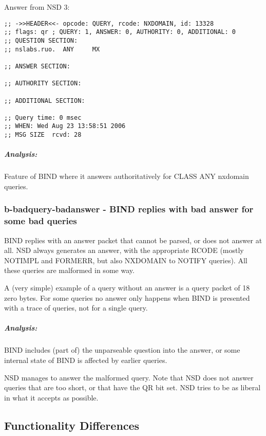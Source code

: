 \documentclass[twoside,titlepage,english]{nlnetlabs}
\begin{document}
Answer from NSD 3:

\footnotesize
\begin{verbatim}
;; ->>HEADER<<- opcode: QUERY, rcode: NXDOMAIN, id: 13328
;; flags: qr ; QUERY: 1, ANSWER: 0, AUTHORITY: 0, ADDITIONAL: 0
;; QUESTION SECTION:
;; nslabs.ruo.  ANY     MX

;; ANSWER SECTION:

;; AUTHORITY SECTION:

;; ADDITIONAL SECTION:

;; Query time: 0 msec
;; WHEN: Wed Aug 23 13:58:51 2006
;; MSG SIZE  rcvd: 28
\end{verbatim}
\normalsize

\vspace{-8pt}\subparagraph{Analysis:}

Feature of BIND where it answers authoritatively for CLASS ANY 
nxdomain queries.


\subsubsection{b-badquery-badanswer - BIND replies with bad answer for
                            some bad queries}
\label{b-badquery-badanswer}

BIND replies with an answer packet that cannot be parsed, or does
not answer at all. NSD always generates
an answer, with the appropriate RCODE (mostly NOTIMPL and FORMERR, but
also NXDOMAIN to NOTIFY queries). All these queries are malformed in 
some way. 

A (very simple) example of a query without an answer
is a query packet of 18 zero bytes. For some queries no answer
only happens when BIND is presented with a trace of queries, not for 
a single query.

\vspace{-8pt}\subparagraph{Analysis:}

BIND includes (part of) the unparseable question into the answer, or
some internal state of BIND is affected by earlier queries. 

NSD manages to answer the malformed query. Note that NSD does not answer 
queries that are too short, or that have the QR bit set. NSD tries to be
as liberal in what it accepts as possible.


\subsection{Functionality Differences}
\label{sec:funcdiff}
\end{document}
